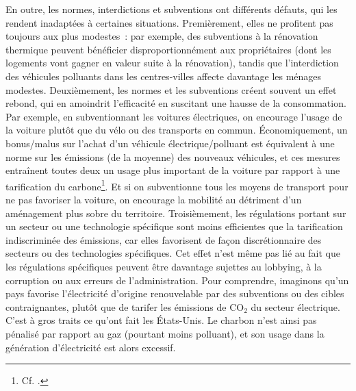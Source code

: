 \documentclass[a5paper,french,openany]{memoir}
\begin{document}
En outre, les normes, interdictions et subventions ont différents défauts, qui les rendent inadaptées à certaines situations. Premièrement, elles ne profitent pas toujours aux plus modestes~: par exemple, des subventions à la rénovation thermique peuvent bénéficier disproportionnément aux propriétaires (dont les logements vont gagner en valeur suite à la rénovation), tandis que l'interdiction des véhicules polluants dans les centres-villes affecte davantage les ménages modestes. Deuxièmement, les normes et les subventions créent souvent un effet rebond, qui en amoindrit l'efficacité en suscitant une hausse de la consommation. Par exemple, en subventionnant les voitures électriques, on encourage l'usage de la voiture plutôt que du vélo ou des transports en commun. 
Économiquement, un bonus/malus sur l'achat d'un véhicule électrique/polluant est équivalent à une norme sur les émissions (de la moyenne) des nouveaux véhicules, et ces mesures entraînent toutes deux un usage plus important de la voiture par rapport à une tarification du carbone\footnote{Cf. \cite{fullerton_suggested_2003}.}. Et si on subventionne tous les moyens de transport pour ne pas favoriser la voiture, on encourage la mobilité au détriment d'un aménagement plus sobre du territoire. %
Troisièmement, les régulations portant sur un secteur ou une technologie spécifique sont moins efficientes que la tarification indiscriminée des émissions, car elles favorisent de façon discrétionnaire des secteurs ou des technologies spécifiques. Cet effet n'est même pas lié au fait que les régulations spécifiques peuvent être davantage sujettes au lobbying, à la corruption ou aux erreurs de l'administration. 
Pour comprendre, imaginons qu'un pays favorise l'électricité d'origine renouvelable par des subventions ou des cibles contraignantes, plutôt que de tarifer les émissions de CO$_\text{2}$ du secteur électrique. C'est à gros traits ce qu'ont fait les États-Unis. Le charbon n'est ainsi pas pénalisé par rapport au gaz (pourtant moins polluant), et son usage dans la génération d'électricité est alors excessif. %
\end{document}

